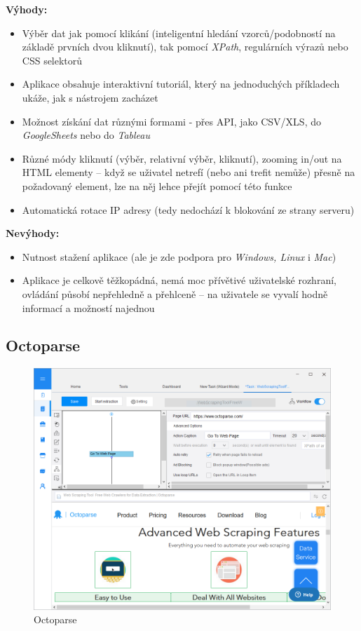 \documentclass[thesis=B,czech]{FITthesis}[2012/06/26]
\begin{document}
\textbf{Výhody:}
\begin{itemize}
	\item Výběr dat jak pomocí klikání (inteligentní hledání vzorců/podobností na základě prvních dvou kliknutí), tak pomocí \emph{XPath}, regulárních výrazů nebo CSS selektorů
	\item Aplikace obsahuje interaktivní tutoriál, který na jednoduchých příkladech ukáže, jak s nástrojem zacházet
	\item Možnost získání dat různými formami - přes API, jako CSV/XLS, do \emph{GoogleSheets} nebo do \emph{Tableau}
	\item Různé módy kliknutí (výběr, relativní výběr, kliknutí), zooming in/out na HTML elementy -- když se uživatel netrefí (nebo ani trefit nemůže) přesně na požadovaný element, lze na něj lehce přejít pomocí této funkce
	\item Automatická rotace IP adresy (tedy nedochází k blokování ze strany serveru)
\end{itemize}

\textbf{Nevýhody:}
\begin{itemize}
	\item Nutnost stažení aplikace (ale je zde podpora pro \emph{Windows, Linux} i \emph{Mac})
	\item Aplikace je celkově těžkopádná, nemá moc přívětivé uživatelské rozhraní, ovládání působí nepřehledně a přehlceně -- na uživatele se vyvalí hodně informací a možností najednou
\end{itemize}


\newpage
\subsection{Octoparse}
\begin{figure}[h]
	\includegraphics[width=\linewidth]{images/Octoparse.png}
	\caption{Octoparse}
	\label{fig:octoparse}
\end{figure}
\end{document}
